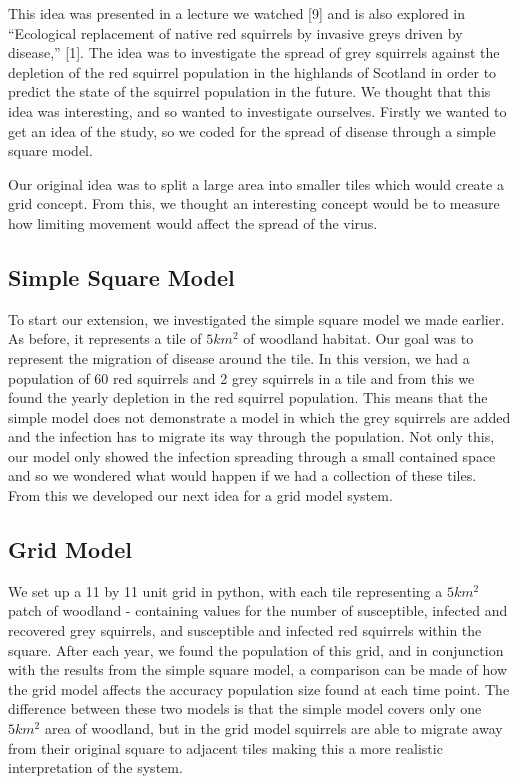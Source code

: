\documentclass{article}
\begin{document}
This idea was presented in a lecture we watched [9] and is also explored in “Ecological replacement of native red squirrels by invasive greys driven by disease,” [1]. The idea was to investigate the spread of grey squirrels against the depletion of the red squirrel population in the highlands of Scotland in order to predict the state of the squirrel population in the future. We thought that this idea was interesting, and so wanted to investigate ourselves. Firstly we wanted to get an idea of the study, so we coded for the spread of disease through a simple square model.

Our original idea was to split a large area into smaller tiles which would create a grid concept. From this, we thought an interesting concept would be to measure how limiting movement would affect the spread of the virus. 

\subsection{\textbf{Simple Square Model}}

To start our extension, we investigated the simple square model we made earlier. As before, it represents a tile of $5km^{2}$ of woodland habitat. Our goal was to represent the migration of disease around the tile. In this version, we had a population of 60 red squirrels and 2 grey squirrels in a tile and from this we found the yearly depletion in the red squirrel population. This means that the simple model does not demonstrate a model in which the grey squirrels are added and the infection has to migrate its way through the population. Not only this, our model only showed the infection spreading through a small contained space and so we wondered what would happen if we had a collection of these tiles. From this we developed our next idea for a grid model system.

\subsection{\textbf{Grid Model}}

We set up a 11 by 11 unit grid in python, with each tile representing a $5km^{2}$ patch of woodland - containing values for the number of susceptible, infected and recovered grey squirrels, and susceptible and infected red squirrels within the square. After each year, we found the population of this grid, and in conjunction with the results from the simple square model, a comparison can be made of how the grid model affects the accuracy population size found at each time point. The difference between these two models is that the simple model covers only one $5km^{2}$ area of woodland, but in the grid model squirrels are able to migrate away from their original square to adjacent tiles making this a more realistic interpretation of the system. 
\end{document}
